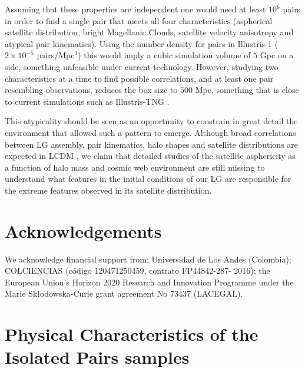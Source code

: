 \documentclass[a4paper,fleqn,usenatbib]{mnras}
\begin{document}
Assuming that these properties are independent one would need at
least $10^6$ pairs in order to find a single pair that meets all four
characteristics (aspherical satellite distribution, bright Magellanic
Clouds, satellite velocity anisotropy and atypical pair kinematics).
Using the number density for pairs in Illustris-1 ($2\times 10^{-5}$
pairs/Mpc$^{3}$) this would imply a cubic simulation volume of $5$ Gpc on a
side, something unfeasible under current technology.
However, studying two characteristics at a time to find possible
correlations, and at least one pair resembling observations, reduces
the box size to $500$ Mpc, something that is close to current
simulations such as Illustris-TNG \citep{2018MNRAS.473.4077P}. 

This atypicality should be seen as an opportunity to constrain in
great detail the environment that allowed such a pattern to emerge. 
Although broad correlations between LG assembly, pair kinematics, halo
shapes and satellite distributions are expected in LCDM
\citep{2011MNRAS.417.1434F,2014MNRAS.443.1090F,2015ApJ...799...45F,2015MNRAS.452.1052L},
we claim that detailed studies of the satellite asphericity as a
function of halo mass and cosmic web environment are still missing to
understand what features in the initial conditions of our LG are
responsible for the extreme features observed in its satellite
distribution. 

\section*{Acknowledgements} 
We acknowledge financial support from: Universidad de Los Andes
(Colombia); COLCIENCIAS (c\'odigo 120471250459, contrato FP44842-287-
2016); the European Union's Horizon 2020 Research and Innovation
Programme under the Marie Sk\l{}odowska-Curie grant agreement No 73437
(LACEGAL).  
  



\appendix


\section{Physical Characteristics of the Isolated Pairs samples}
\label{appendix:physical}
\end{document}
